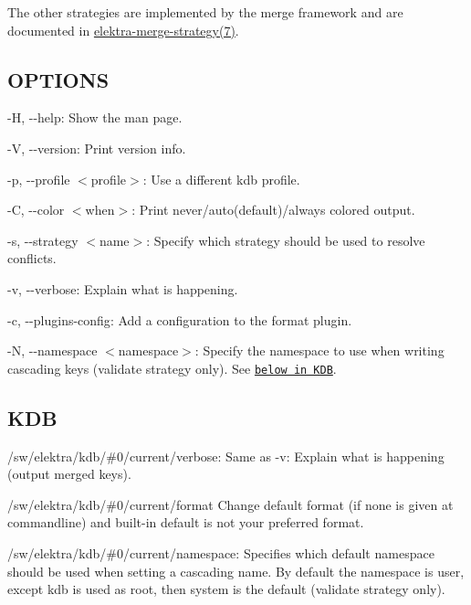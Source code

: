 The other strategies are implemented by the merge framework and are documented in \hyperlink{md_doc_help_elektra-merge-strategy_doc_help_elektra-merge-strategy_md}{elektra-\/merge-\/strategy(7)}.

\subsection*{O\+P\+T\+I\+O\+NS}


\begin{DoxyItemize}
\item {\ttfamily -\/H}, {\ttfamily -\/-\/help}\+: Show the man page.
\item {\ttfamily -\/V}, {\ttfamily -\/-\/version}\+: Print version info.
\item {\ttfamily -\/p}, {\ttfamily -\/-\/profile $<$profile$>$}\+: Use a different kdb profile.
\item {\ttfamily -\/C}, {\ttfamily -\/-\/color $<$when$>$}\+: Print never/auto(default)/always colored output.
\item {\ttfamily -\/s}, {\ttfamily -\/-\/strategy $<$name$>$}\+: Specify which strategy should be used to resolve conflicts.
\item {\ttfamily -\/v}, {\ttfamily -\/-\/verbose}\+: Explain what is happening.
\item {\ttfamily -\/c}, {\ttfamily -\/-\/plugins-\/config}\+: Add a configuration to the format plugin.
\item {\ttfamily -\/N}, {\ttfamily -\/-\/namespace $<$namespace$>$}\+: Specify the namespace to use when writing cascading keys ({\ttfamily validate} strategy only). See \href{#KDB}{\tt below in K\+DB}.
\end{DoxyItemize}

\subsection*{K\+DB}


\begin{DoxyItemize}
\item {\ttfamily /sw/elektra/kdb/\#0/current/verbose}\+: Same as {\ttfamily -\/v}\+: Explain what is happening (output merged keys).
\item {\ttfamily /sw/elektra/kdb/\#0/current/format} Change default format (if none is given at commandline) and built-\/in default is not your preferred format.
\item {\ttfamily /sw/elektra/kdb/\#0/current/namespace}\+: Specifies which default namespace should be used when setting a cascading name. By default the namespace is user, except {\ttfamily kdb} is used as root, then {\ttfamily system} is the default ({\ttfamily validate} strategy only).
\end{DoxyItemize}

